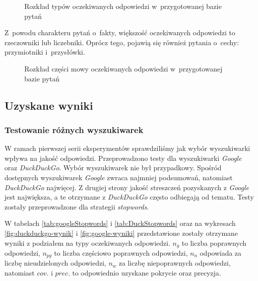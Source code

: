 \begin{figure}[h!]
    \label{fig:rozklad-typow-odpowiedzi}  
    \caption{Rozkład typów oczekiwanych odpowiedzi w~przygotowanej bazie pytań}
\end{figure}

Z~powodu charakteru pytań o~fakty, większość oczekiwanych odpowiedzi to rzeczowniki lub liczebniki. Oprócz tego, pojawią się również pytania o~cechy: przymiotniki i~przysłówki.

\begin{figure}[h!]
    \label{fig:rozklad-typow-odpowiedzi2}  
    \caption{Rozkład części mowy oczekiwanych odpowiedzi w~przygotowanej bazie pytań}
\end{figure}

\subsection{Uzyskane wyniki}

\subsubsection{Testowanie różnych wyszukiwarek}
W ramach pierwszej serii eksperymentów sprawdziliśmy jak wybór wyszukiwarki wpływa na jakość odpowiedzi. Przeprowadzono testy dla wyszukiwarki \textit{Google} oraz \textit{DuckDuckGo}. Wybór wyszukiwarek nie był przypadkowy. Spośród dostępnych wyszukiwarek \textit{Google} zwraca najmniej podsumowań, natomiast \textit{DuckDuckGo} najwięcej. Z drugiej strony jakość streszczeń pozyskanych z \textit{Google} jest największa, a te otrzymane z \textit{DuckDuckGo} często odbiegają od tematu. Testy zostały przeprowadzone dla strategii \textit{stopwords}.

W tabelach \ref{tab:googleStopwords} i \ref{tab:DuckStopwords} oraz na wykresach \ref{fig:duckduckgo-wynik} i \ref{fig:google-wyniki} przedstawione zostały otrzymane wyniki z podziałem na typy oczekiwanych odpowiedzi. $n_g$ to liczba poprawnych odpowiedzi, $n_{pg}$ to liczba częściowo poprawnych odpowiedzi, $n_n$ odpowiada za liczbę nieudzielonych odpowiedzi, $n_w$ za liczbę niepoprawnych odpowiedzi, natomiast $cov.$ i $prec.$ to odpowiednio uzyskane pokrycie oraz precyzja.

